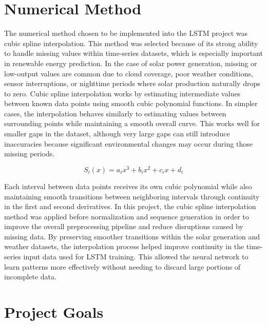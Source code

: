 \documentclass[11pt]{article}
\begin{document}
\section{Numerical Method}

	The numerical method chosen to be implemented into the LSTM project was cubic spline interpolation. This method was selected because of its strong ability to handle missing values within time-series datasets, which is especially important in renewable energy prediction. In the case of solar power generation, missing or low-output values are common due to cloud coverage, poor weather conditions, sensor interruptions, or nighttime periods where solar production naturally drops to zero. Cubic spline interpolation works by estimating intermediate values between known data points using smooth cubic polynomial functions. In simpler cases, the interpolation behaves similarly to estimating values between surrounding points while maintaining a smooth overall curve. This works well for smaller gaps in the dataset, although very large gaps can still introduce inaccuracies because significant environmental changes may occur during those missing periods.

\[
S_i(x)=a_i x^3+b_i x^2+c_i x+d_i
\]

	Each interval between data points receives its own cubic polynomial while also maintaining smooth transitions between neighboring intervals through continuity in the first and second derivatives. In this project, the cubic spline interpolation method was applied before normalization and sequence generation in order to improve the overall preprocessing pipeline and reduce disruptions caused by missing data. By preserving smoother transitions within the solar generation and weather datasets, the interpolation process helped improve continuity in the time-series input data used for LSTM training. This allowed the neural network to learn patterns more effectively without needing to discard large portions of incomplete data.

\section{Project Goals}

\end{document}
